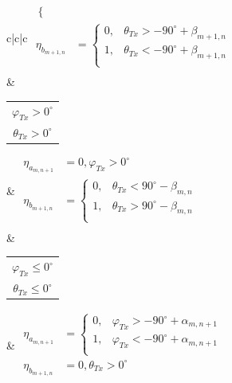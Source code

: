 \begin{table}[tb]
\begin{tabular}{c|c|c}
\begin{math}
\begin{aligned}
\begin{cases}
				\end{cases}\\
				\eta_{b_{m+1,n}} &=
				\begin{cases}
					0, & \theta_{Tx} > -90^\circ + \beta_{m+1,n}\\
					1, & \theta_{Tx} < -90^\circ + \beta_{m+1,n}\\
				\end{cases} \\
			\end{aligned}	
		\end{math}\\
		\hline
		& 
		\begin{tabular}{@{}c@{}}$\varphi_{Tx}>0^\circ $ \\ $\theta_{Tx}>0^\circ $ \end{tabular}
		&
		\begin{math}
			\begin{aligned}
				\eta_{a_{m,n+1}} &= 0, \varphi_{Tx} > 0^\circ\\
				\eta_{b_{m+1,n}} &=
				\begin{cases}
					0, & \theta_{Tx} < 90^\circ - \beta_{m,n}\\
					1, & \theta_{Tx} > 90^\circ - \beta_{m,n}\\
				\end{cases}\\
			\end{aligned}		
		\end{math}\\
		& 
		\begin{tabular}{@{}c@{}}$\varphi_{Tx} \leq 0^\circ $ \\ $\theta_{Tx} \leq 0^\circ $ \end{tabular}
		&
		\begin{math}
			\begin{aligned}
				\eta_{a_{m,n+1}} &=
				\begin{cases}
					0, & \varphi_{Tx} > -90^\circ + \alpha_{m,n+1}\\
					1, & \varphi_{Tx} < -90^\circ + \alpha_{m,n+1}\\
				\end{cases}\\
				\eta_{b_{m+1,n}} &= 0, \theta_{Tx} > 0^\circ\\
			\end{aligned}		
		\end{math}	\\
	\end{tabular}
\end{table}
